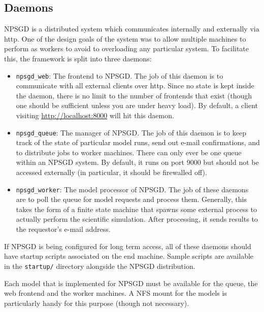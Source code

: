 \documentclass{article}
\newcommand{\mpath}[1]{\texttt{#1}}
\begin{document}
\subsection{Daemons}
NPSGD is a distributed system which communicates internally and externally via
http. One of the design goals of the system was to allow multiple machines to
perform as workers to avoid to overloading any particular system. To
facilitate this, the framework is split into three daemons:
\begin{itemize}
    \item \texttt{npsgd\_web}: The frontend to NPSGD. The job of this daemon is
    to communicate with all external clients over http. Since no state is kept
    inside the daemon, there is no limit to the number of frontends that exist (though one
    should be sufficient unless you are under heavy load). By default, a
    client visiting \url{http://localhost:8000} will hit this daemon.

    \item \texttt{npsgd\_queue}: The manager of NPSGD. The job of this daemon is
    to keep track of the state of particular model runs, send out e-mail
    confirmations, and to distribute jobs to worker machines. There can only
    ever be one queue within an NPSGD system. By default, it runs on port 9000
    but should not be accessed externally (in particular, it should be
    firewalled off).

    \item \texttt{npsgd\_worker}: The model processor of NPSGD. The job of these
    daemons are to poll the queue for model requests and process them.
    Generally, this takes the form of a finite state machine that spawns some
    external process to actually perform the scientific simulation. After
    processing, it sends results to the requestor's e-mail address.
\end{itemize}

If NPSGD is being configured for long term access, all of these daemons should
have startup scripts associated on the end machine. Sample scripts are available
in the \mpath{startup/} directory alongside the NPSGD distribution.

Each model that is implemented for NPSGD must be available for the queue, the
web frontend and the worker machines. A NFS mount for the models is particularly
handy for this purpose (though not necessary).
\end{document}
